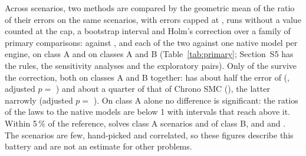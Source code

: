 Across scenarios, two methods are compared by the geometric mean of the ratio of their errors
on the same scenarios, with errors capped at , runs without a value counted
at the cap, a bootstrap interval and Holm's correction over a family of 
primary comparisons:  against , and each of the two against one
native model per engine, on class A and on classes A and B (Table~\ref{tab:primary};
Section~S5 has the rules, the sensitivity analyses and the exploratory pairs). Only
 of the  survive the correction, both on classes
A and B together:  has about half the error of 
(, adjusted $p = $
) and about a quarter of that of Chrono SMC
(), the latter narrowly (adjusted $p = $
). On class A alone no difference is significant:
the ratios of the laws to the native models are below 1 with intervals that reach above it.
Within 5\,\% of the reference,  solves  class A
scenarios and  of class B, and 
 and . The scenarios are few, hand-picked
and correlated, so these figures describe this battery and are not an estimate for other
problems.

\begin{table}[t]
\caption{The primary comparisons: geometric mean of the ratio of the errors of two methods on
the same scenarios (base variant; a law against a native model on that model's engine), with
its 95\,\% bootstrap interval and the Holm-adjusted $p$ over the 
comparisons. Bold: adjusted $p$ below 0.05}
\label{tab:primary}
\end{table}
